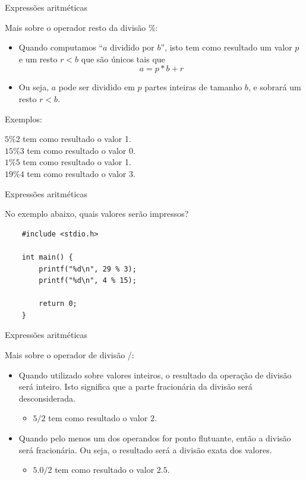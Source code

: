 \documentclass[handout]{beamer}
\begin{document}
\begin{frame}[fragile]{Expressões aritméticas}

    Mais sobre o operador resto da divisão \%:
    \begin{itemize}[<+->]
        \item Quando computamos ``$a$ dividido por $b$'', isto tem como resultado um valor $p$ e um resto $r < b$ que são únicos tais que $$a = p*b +r$$
        \item Ou seja, $a$ pode ser dividido em $p$ partes inteiras de tamanho $b$, e sobrará um resto $r < b$.
    \end{itemize}

    \pause
    Exemplos:

    $5\%2$ tem como resultado o valor 1.\\
    $15\%3$ tem como resultado o valor 0.\\
    $1\%5$ tem como resultado o valor 1.\\
    $19\%4$ tem como resultado o valor 3.
\end{frame}


\begin{frame}[fragile]{Expressões aritméticas}

    No exemplo abaixo, quais valores serão impressos?

    \begin{verbatim}
    #include <stdio.h>

    int main() {
        printf("%d\n", 29 % 3);
        printf("%d\n", 4 % 15);

        return 0;
    }
    \end{verbatim}

\end{frame}



\begin{frame}[fragile]{Expressões aritméticas}

    Mais sobre o operador de divisão /:
    \begin{itemize}[<+->]
        \item Quando utilizado sobre valores inteiros, o resultado da operação de divisão será inteiro.
        Isto significa que a parte fracionária da divisão será desconsiderada.
        \begin{itemize}
            \item $5/2$ tem como resultado o valor $2$.
        \end{itemize}
        \item Quando pelo menos um dos operandos for ponto flutuante, então a divisão será fracionária.
        Ou seja, o resultado será a divisão exata dos valores.
        \begin{itemize}
            \item $5.0 / 2$ tem como resultado o valor $2.5$.
        \end{itemize}
    \end{itemize}
\end{frame}
\end{document}
